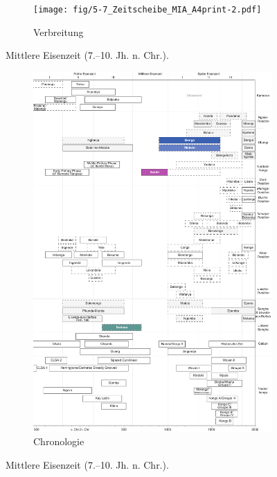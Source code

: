 \begin{figure}[p]
	\centering
	\begin{subfigure}[b]{\textwidth}
		\centering
		\texttt{[image: fig/5-7\_Zeitscheibe\_MIA\_A4print-2.pdf]}
		\vspace{4cm}
		\caption{Verbreitung}
		\label{fig:MIA_Karte}
	\end{subfigure}
	\caption{Mittlere Eisenzeit (7.--10. Jh. n. Chr.).}
	\label{}
\end{figure}
\addtocounter{figure}{-1}
\begin{figure}[p]
	\begin{subfigure}[b]{\textwidth}
		\setcounter{subfigure}{1}
		\centering
		\includegraphics[height = .9\textheight]{fig/Chronologiesystem_v4_Zeitscheibe_MIA.pdf}
		\caption{Chronologie}
		\label{fig:MIA_Chronologie}
	\end{subfigure}
	\caption{Mittlere Eisenzeit (7.--10. Jh. n. Chr.).}
	\label{fig:MIA}
\end{figure}

